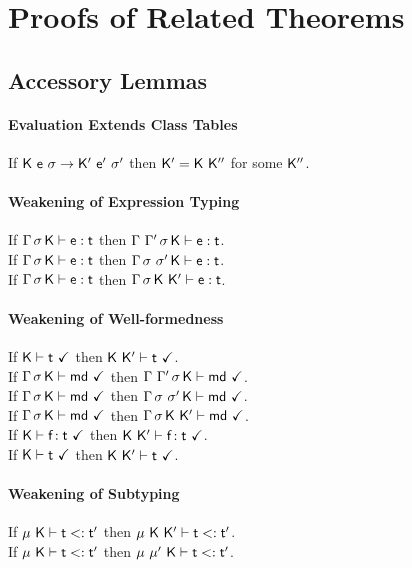 \documentclass[acmlarge, anonymous, authordraft]{acmart}
\begin{document}
\section{Proofs of Related Theorems}

\subsection{Accessory Lemmas}

\paragraph{Evaluation Extends Class Tables}

If ${{\sf{K}}}~{{\sf{e}}}~{\sigma} \rightarrow {{\ensuremath{{\sf{K'}}}}}~{{{{\sf{e'}}}}}~{{{\sigma'}}}$ then ${{\sf{K'}}} = {\sf{K}}~{{\sf{K''}}}$ for some ${{\sf{K''}}}$.

\paragraph{Weakening of Expression Typing}

If $\EnvType\Env\s\K\e\t$ then $\EnvType{\Env~\Envp}\s\K\e\t$. \\ 
If $\EnvType\Env\s\K\e\t$ then $\EnvType\Env{\s~\s'}\K\e\t$. \\ 
If $\EnvType\Env\s\K\e\t$ then $\EnvType\Env\s{\K~\Kp}\e\t$. \\ 

\paragraph{Weakening of Well-formedness}

If $\WFtype\K\t$ then $\WFtype{\K~\Kp}\t$. \\
If $\Gamma\,\sigma\,{\sf{K}}\vdash{\sf{md}} ~\checkmark$ then $\Gamma~\Gamma'\,\sigma\,{\sf{K}}\vdash{\sf{md}} ~\checkmark$.\\
If $\Gamma\,\sigma\,{\sf{K}}\vdash{\sf{md}} ~\checkmark$ then $\Gamma\,\sigma~\sigma'\,{\sf{K}}\vdash{\sf{md}} ~\checkmark$.\\
If $\Gamma\,\sigma\,{\sf{K}}\vdash{\sf{md}} ~\checkmark$ then $\Gamma\,\sigma\,{\sf{K}}~{{\sf{K'}}}\vdash{\sf{md}} ~\checkmark$.\\
If $\WFtype\K{\Fdef\f\t}$ then $\WFtype{\K~\Kp}{\Fdef\f\t}$.\\
If $\WFtype\K\t$ then $\WFtype{\K~\Kp}\t$.\\

\paragraph{Weakening of Subtyping}

If $\StrSub\M{\K}\t\tp$ then $\StrSub\M{\K~\Kp}\t\tp$. \\
If $\StrSub{\M}{\K}\t\tp$ then $\StrSub{\M~\M'}{\K}\t\tp$.
\end{document}
